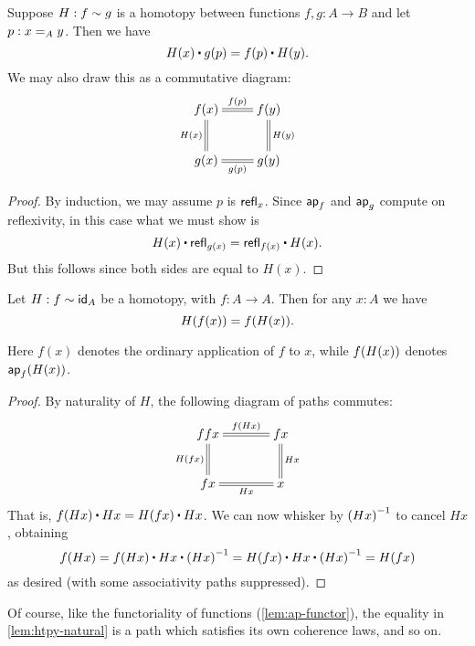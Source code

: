 \begin{lem}\label{lem:htpy-natural}
  Suppose $H:f\htpy g$ is a homotopy between functions $f,g:A\to B$ and let $p:\id[A]xy$.  Then we have
  \begin{equation*}
    H(x)\ct\ap{g}{p}=\ap{f}{p}\ct H(y).
  \end{equation*}
  We may also draw this as a commutative diagram:
  \begin{align*}
    \xymatrix{
      f(x) \ar@{=}[r]^{\ap fp} \ar@{=}[d]_{H(x)} & f(y) \ar@{=}[d]^{H(y)} \\
      g(x) \ar@{=}[r]_{\ap gp} & g(y)
    }
  \end{align*}
\end{lem}
\begin{proof}
  By induction, we may assume $p$ is $\refl x$.
  Since $\apfunc{f}$ and $\apfunc g$ compute on reflexivity, in this case what we must show is
  \[ H(x) \ct \refl{g(x)} = \refl{f(x)} \ct H(x). \]
  But this follows since both sides are equal to $H(x)$.
\end{proof}

\begin{cor}\label{cor:hom-fg}
  Let $H : f \htpy \idfunc[A]$ be a homotopy, with $f : A \to A$. Then for any $x : A$ we have \[ H(f(x)) = \ap f{H(x)}. \]
\end{cor}
\noindent
Here $f(x)$ denotes the ordinary application of $f$ to $x$, while $\ap f{H(x)}$ denotes $\apfunc{f}(H(x))$.
\begin{proof}
By naturality of $H$, the following diagram of paths commutes:
\begin{align*}
\xymatrix@C=3pc{
ffx \ar@{=}[r]^-{\ap f{Hx}} \ar@{=}[d]_{H(fx)} & fx \ar@{=}[d]^{Hx} \\
fx \ar@{=}[r]_-{Hx} & x
}
\end{align*}
That is, $\ap f{H x} \ct H x = H(f x) \ct H x$.
We can now whisker by $\opp{(H x)}$ to cancel $H x$, obtaining
\[ \ap f{H x}
= \ap f{H x} \ct H x \ct \opp{(H x)}
= H(f x) \ct H x \ct \opp{(H x)}
= H(f x)
\]
as desired (with some associativity paths suppressed).
\end{proof}

Of course, like the functoriality of functions (\autoref{lem:ap-functor}), the equality in \autoref{lem:htpy-natural} is a path which satisfies its own coherence laws, and so on.

%

